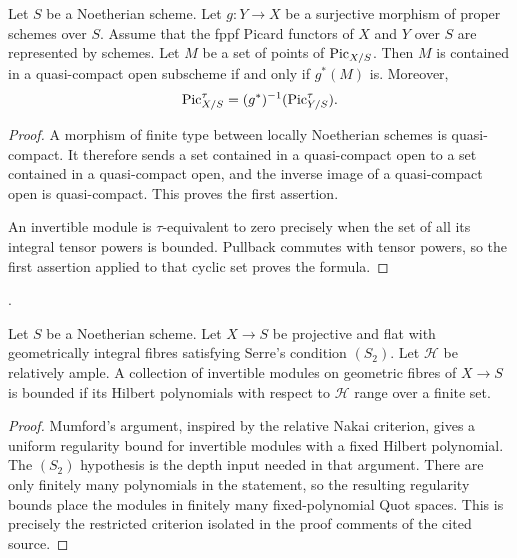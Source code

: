 \begin{lemma}
\label{lemma-picard-proper-pullback-detects-boundedness}
Let $S$ be a Noetherian scheme. Let $g : Y \to X$ be a surjective morphism
of proper schemes over $S$. Assume that the fppf Picard functors of $X$ and
$Y$ over $S$ are represented by schemes. Let $M$ be a set of points of
$\mathrm{Pic}_{X/S}$. Then $M$ is contained in a
quasi-compact open subscheme if and only if $g^*(M)$ is. Moreover,
$$
\mathrm{Pic}_{X/S}^{\tau}
= (g^*)^{-1}(\mathrm{Pic}_{Y/S}^{\tau}).
$$
\end{lemma}

\begin{proof}
A morphism of finite type between locally Noetherian schemes is quasi-compact.
It therefore sends a set contained in a quasi-compact open to a set contained
in a quasi-compact open, and the inverse image of a quasi-compact open is
quasi-compact. This proves the first assertion.

An invertible module is $\tau$-equivalent to zero precisely when the set of
all its integral tensor powers is bounded. Pullback commutes with tensor
powers, so the first assertion applied to that cyclic set proves the formula.
\end{proof}

\begin{lemma}
\label{lemma-picard-boundedness-s2-full-polynomial}
\begin{reference}
\cite[Supplement to Expos\'e 236, proof comments, p. 306]{FGA}.
\end{reference}
Let $S$ be a Noetherian scheme. Let $X \to S$ be projective and flat with
geometrically integral fibres satisfying Serre's condition $(S_2)$. Let
$\mathcal{H}$ be relatively ample. A collection of invertible modules on
geometric fibres of $X \to S$ is bounded if its Hilbert polynomials with
respect to $\mathcal{H}$ range over a
finite set.
\end{lemma}

\begin{proof}
Mumford's argument, inspired by the relative Nakai criterion, gives a
uniform regularity bound for invertible modules with a fixed Hilbert
polynomial. The $(S_2)$ hypothesis is the depth input needed in that argument.
There are only finitely many polynomials in the statement, so the resulting
regularity bounds place the modules in finitely many fixed-polynomial Quot
spaces. This is precisely the restricted criterion isolated in the proof
comments of the cited source.
\end{proof}

